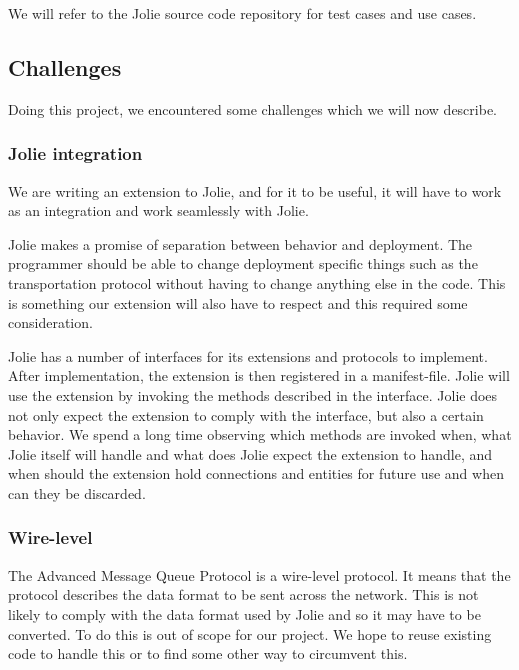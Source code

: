 We will refer to the Jolie source code repository for test cases and use cases.
\subsection{Challenges}
Doing this project, we encountered some challenges which we will now describe.
\subsubsection{Jolie integration}
\label{subsubsec:Jolie integration}
We are writing an extension to Jolie, and for it to be useful, it will have to work as an integration and work seamlessly with Jolie.

Jolie makes a promise of separation between behavior and deployment. The programmer should be able to change deployment specific things such as the transportation protocol without having to change anything else in the code. This is something our extension will also have to respect and this required some consideration.

Jolie has a number of interfaces for its extensions and protocols to implement. After implementation, the extension is then registered in a manifest-file. Jolie will use the extension by invoking the methods described in the interface. Jolie does not only expect the extension to comply with the interface, but also a certain behavior. We spend a long time observing which methods are invoked when, what Jolie itself will handle and what does Jolie expect the extension to handle, and when should the extension hold connections and entities for future use and when can they be discarded.
\subsubsection{Wire-level}
The Advanced Message Queue Protocol is a wire-level protocol. It means that the protocol describes the data format to be sent across the network. This is not likely to comply with the data format used by Jolie and so it may have to be converted. To do this is out of scope for our project. We hope to reuse existing code to handle this or to find some other way to circumvent this.
